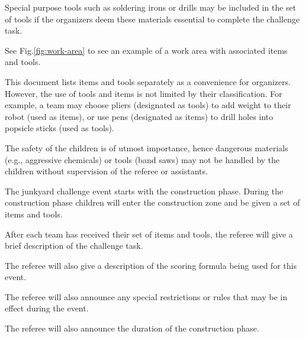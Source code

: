 \documentclass[12pt]{hurocup}
\begin{document}
\begin{decisions}
  Special purpose tools such as soldering irons or drills may be
  included in the set of tools if the organizers deem these materials
  essential to complete the challenge task.

  See Fig.\ref{fig:work-area} to see an example of a work area with
  associated items and tools.

\item This document lists items and tools separately as a convenience
  for organizers. However, the use of tools and items is not limited
  by their classification. For example, a team may choose pliers
  (designated as tools) to add weight to their robot (used as items),
  or use pens (designated as items) to drill holes into popsicle
  sticks (used as tools).

\item The safety of the children is of utmost importance, hence
  dangerous materials (e.g., aggressive chemicals) or tools (band
  saws) may not be handled by the children without supervision of the
  referee or assistants.

\end{decisions}

\label{law-game-play}

\begin{lawlist}[JC]

\item The junkyard challenge event starts with the construction
  phase. During the construction phase children will enter the
  construction zone and be given a set of items and tools.

\item \label{g-task} After each team has received their set of items
  and tools, the referee will give a brief description of the
  challenge task.

\item \label{g-score} The referee will also give a description of the
  scoring formula being used for this event.

\item \label{g-rule} The referee will also announce any special
  restrictions or rules that may be in effect during the event.

\item \label{g-duration} The referee will also announce the duration
  of the construction phase.

\end{lawlist}
\end{document}
